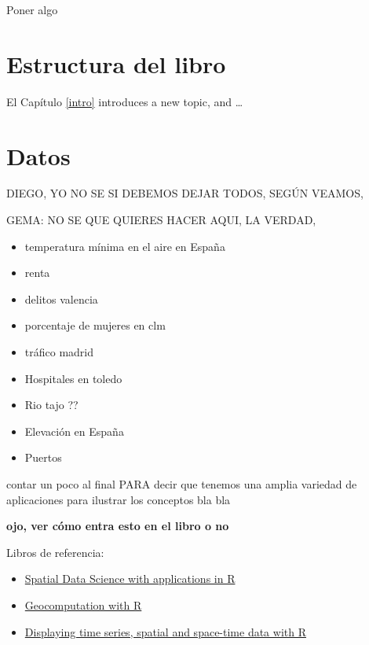 \documentclass[
]{report}
\providecommand{\tightlist}{%
  \setlength{\itemsep}{0pt}\setlength{\parskip}{0pt}}
\theoremstyle{definition}
\theoremstyle{definition}
\theoremstyle{definition}
\theoremstyle{definition}
\theoremstyle{remark}
\begin{document}
Poner algo

\hypertarget{estructura-del-libro}{%
\section*{Estructura del libro}\label{estructura-del-libro}}

El Capítulo \ref{intro} introduces a new topic, and \ldots{}

\hypertarget{datos}{%
\section*{Datos}\label{datos}}

DIEGO, YO NO SE SI DEBEMOS DEJAR TODOS, SEGÚN VEAMOS,

GEMA: NO SE QUE QUIERES HACER AQUI, LA VERDAD,

\begin{itemize}
\tightlist
\item
  temperatura mínima en el aire en España
\item
  renta
\item
  delitos valencia
\item
  porcentaje de mujeres en clm
\item
  tráfico madrid
\item
  Hospitales en toledo
\item
  Rio tajo ??
\item
  Elevación en España
\item
  Puertos
\end{itemize}

contar un poco al final PARA decir que tenemos una amplia variedad de
aplicaciones para ilustrar los conceptos bla bla

\textbf{ojo, ver cómo entra esto en el libro o no}

Libros de referencia:

\begin{itemize}
\item
  \href{https://keen-swartz-3146c4.netlify.app/}{Spatial Data Science with applications in
  R}
\item
  \href{https://geocompr.robinlovelace.net/}{Geocomputation with R}
\item
  \href{https://oscarperpinan.github.io/bookvis/}{Displaying time series, spatial and space-time data with
  R}
\end{itemize}
\end{document}
